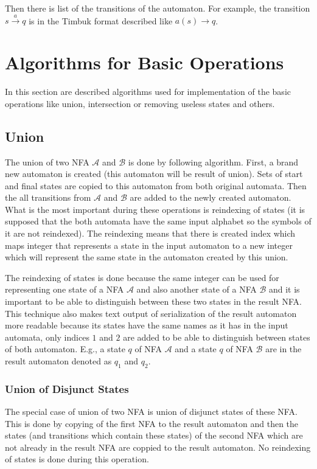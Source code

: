 Then there is list of the transitions of the automaton. 
For example, the transition $s \xrightarrow{a} q$ is in the Timbuk format described like $a(s)\rightarrow q$.

\section{Algorithms for Basic Operations}
In this section are described algorithms used for implementation of the basic operations like union, intersection or removing useless states and others. 

\subsection{Union}
The union of two NFA $\mathcal{A}$ and $\mathcal{B}$ is done by following algorithm. First, a brand new automaton is created (this automaton
will be result of union). Sets of start and final states are copied to this automaton from both original automata. Then the all transitions from $\mathcal{A}$ and
$\mathcal{B}$ are added to the newly created automaton. What is the most important during these operations is reindexing of states (it is supposed
that the both automata have the same input alphabet so the symbols of it are not reindexed). The reindexing means that there is created index which maps
integer that represents a state in the input automaton to a new integer which will represent the same state in the automaton created by this union.

The reindexing of states is done because the same integer can be used for representing one state of a NFA $\mathcal{A}$ 
and also another state of a NFA $\mathcal{B}$ and it is important
to be able to distinguish between these two states in the result NFA. This technique also makes text output of serialization of the result automaton 
more readable because its states have the same names as it has in the input automata, only indices $1$ and $2$ are added to be able to 
distinguish between states of both automaton. E.g., a state $q$ of NFA $\mathcal{A}$ and a state $q$ of NFA $\mathcal{B}$ are in the result automaton denoted
as $q_1$ and $q_2$.

\subsubsection{Union of Disjunct States}
The special case of union of two NFA is union of disjunct states of these NFA. This is done by copying of the first NFA to the result automaton and then
the states (and transitions which contain these states) of the second NFA which are not already in the result NFA are coppied to the result automaton.
No reindexing of states is done during this operation.

